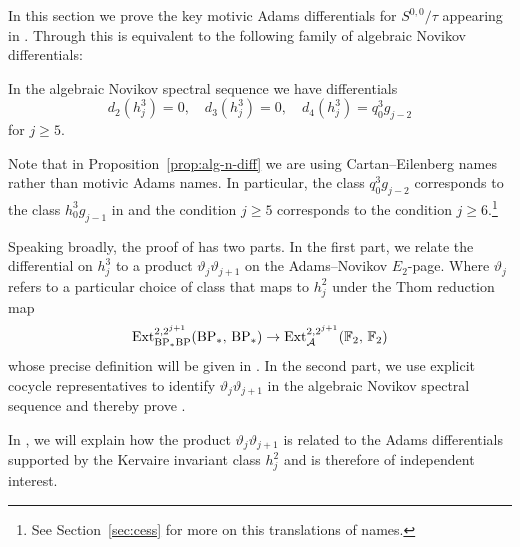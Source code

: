 
In this section we prove the key motivic Adams differentials for $S^{0,0}/\tau$ appearing in .
Through  this is equivalent to the following family of algebraic Novikov differentials:

\begin{prop}\label{prop:alg-n-diff}
   In the algebraic Novikov spectral sequence we have differentials
  \[ d_2(h_j^3) = 0, \quad d_3(h_j^3) = 0, \quad d_4(h_j^3) = q_0^3 g_{j-2}\]
  for $j \geq 5$.
\end{prop}


\begin{rmk}
  Note that in Proposition~\ref{prop:alg-n-diff}
  we are using Cartan--Eilenberg names 
  rather than motivic Adams names.
  In particular, the class $q_0^3g_{j-2}$ corresponds to the class $h_0^3g_{j-1}$ in  and the condition $j \geq 5$ corresponds to the condition $j \geq 6$.\footnote{See Section~\ref{sec:cess} for more on this translations of names.} %
\end{rmk}

Speaking broadly, the proof of  has two parts.
In the first part, we relate the differential on $h_j^3$ to a product $\vartheta_{j}\vartheta_{j+1}$ on the Adams--Novikov $E_2$-page. Where $\vartheta_j$ refers to a particular choice of class that maps to $h_j^2$ under the Thom reduction map 
\[ \operatorname{\mathrm{Ext}}_{\mathrm{BP}_*\mathrm{BP}}^{2, 2^{j+1}}(\mathrm{BP}_*,\, \mathrm{BP}_*) \to \operatorname{\mathrm{Ext}}_{\operatorname{\mathcal{A}}}^{2, 2^{j+1}}(\operatorname{\mathbb{F}}_2,\, \operatorname{\mathbb{F}}_2) \]
whose precise definition will be given in .
In the second part, we use explicit cocycle representatives to identify $\vartheta_{j}\vartheta_{j+1}$ in the algebraic Novikov spectral sequence and thereby prove .

\begin{rmk} 
  In , we will explain how the product $\vartheta_{j}\vartheta_{j+1}$ is related to the Adams differentials supported by the Kervaire invariant class $h_j^2$ and is therefore of independent interest.
\end{rmk}


